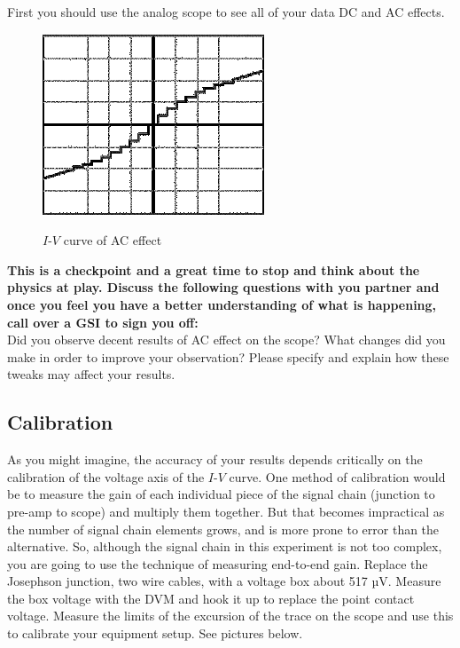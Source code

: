 \documentclass{../lab}
\begin{document}
First you should use the analog scope to see all of your data DC and AC effects.

\begin{figure}[h]
    \centering
    \href{http://experimentationlab.berkeley.edu/sites/default/files/images/250px-JOS17.gif}{\includegraphics[width=0.5\linewidth]{images/250px-JOS17.png}}
    \caption{$I$-$V$ curve of AC effect}
    \label{fig:IVCurveOfACEffect}
\end{figure}


\textbf{This is a checkpoint and a great time to stop and think about the physics at play. Discuss the following questions with you partner and once you feel you have a better understanding of what is happening, call over a GSI to sign you off:}\\
Did you observe decent results of AC effect on the scope? What changes did you make in order to improve your observation? Please specify and explain how these tweaks may affect your results.

\subsection{Calibration}

As you might imagine, the accuracy of your results depends critically on the calibration of the voltage axis of the $I$-$V$ curve. One method of calibration would be to measure the gain of each individual piece of the signal chain (junction to pre-amp to scope) and multiply them together. But that becomes impractical as the number of signal chain elements grows, and is more prone to error than the alternative. So, although the signal chain in this experiment is not too complex, you are going to use the technique of measuring end-to-end gain. Replace the Josephson junction, two wire cables, with a voltage box about 517 µV. Measure the box voltage with the DVM and hook it up to replace the point contact voltage. Measure the limits of the excursion of the trace on the scope and use this to calibrate your equipment setup. See pictures below.
\end{document}
